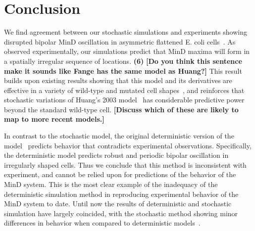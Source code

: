 \documentclass[10pt,letterpaper]{article}
\newcommand{\fixme}[1]{\red{[#1]}}
\newcommand{\red}[1]{{\bf \color{red} #1}}
\newcommand{\blue}[1]{{\bf \color{blue} #1}}
\begin{document}
\section*{Conclusion}
We find agreement between our stochastic simulations and experiments
showing disrupted bipolar MinD oscillation in asymmetric flattened
E. coli cells~\cite{mannik2012robustness}.  As observed
experimentally, our simulations predict that MinD maxima will form in
a spatially irregular sequence of locations.  \blue{(6)}\fixme{Do you think this
  sentence make it sounds like Fange has the same model as Huang?}
This result builds upon existing results showing that this model and
its derivatives are effective in a variety of wild-type and mutated
cell shapes~\cite{fange2006noise, varma2008min,
  kruse2007experimentalist}, and reinforces that stochastic variations
of Huang's 2003 model~\cite{fange2006noise, kerr2006division} has
considerable predictive power beyond the standard wild-type cell.
\fixme{Discuss which of these are likely to map to more recent
  models.}


%

In contrast to the stochastic model, the original deterministic
version of the model~\cite{huang2003dynamic} predicts behavior that
contradicts experimental observations.  Specifically, the
deterministic model predicts robust and periodic bipolar oscillation
in irregularly shaped cells.  Thus we conclude that this method is
inconsistent with experiment, and cannot be relied upon for
predictions of the behavior of the MinD system.  This is the most
clear example of the inadequacy of the deterministic simulation method
in reproducing experimental behavior of the MinD system to date.
Until now the results of deterministic and stochastic simulation have
largely coincided, with the stochastic method showing minor
differences in behavior when compared to deterministic
models~\cite{kerr2006division, fange2006noise, huang2004min,
  kruse2007experimentalist}.
\end{document}
